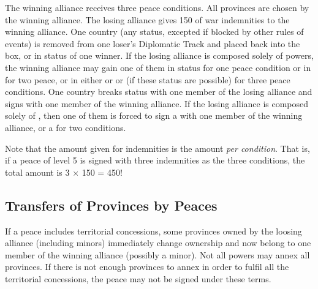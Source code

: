  The winning alliance receives
three peace conditions.
 All provinces are chosen by the winning
alliance.
\bparag[Indemnities] The losing alliance gives 150 \ducats of war indemnities
to the winning alliance.
 One country (any status, excepted if blocked
by other rules of events) is removed from one loser's Diplomatic Track and
placed back into the \Neutral box, or in \MR status of one winner. If the
losing alliance is composed solely of \MIN powers, the winning alliance may
gain one of them in \MR status for one peace condition or in \AM for two
peace, or in either \EG or \VASSAL or \ANNEXION (if these status are possible)
for three peace conditions.
 One \ROTW country breaks status with one
member of the losing alliance and signs \dipFR with one member of the winning
alliance. If the losing alliance is composed solely of \MIN, then one of them
is forced to sign a \dipFR with one member of the winning alliance, or a
\dipAT for two conditions.

\aparag[Indemnities] Note that the amount given for indemnities is the amount
\emph{per condition}. That is, if a peace of level 5 is signed with three
indemnities as the three conditions, the total amount is 3 $\times$ 150 =
450\ducats !



\subsection{Transfers of Provinces by Peaces}\label{chPeace:Transfer
  Provinces Peace}
\aparag If a peace includes territorial concessions, some provinces owned by
the loosing alliance (including minors) immediately change ownership and now
belong to one member of the winning alliance (possibly a minor).
\bparag Not all powers may annex all provinces. If there is not enough
provinces to annex in order to fulfil all the territorial concessions, the
peace may not be signed under these terms.

